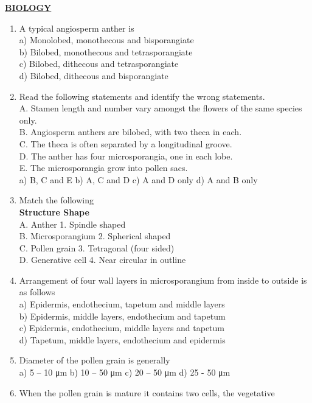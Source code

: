 \textbf{\ul{BIOLOGY}}

\begin{enumerate}
\def\labelenumi{\arabic{enumi}.}
\setcounter{enumi}{90}
\item
  A typical angiosperm anther is\\
  a) Monolobed, monothecous and bisporangiate\\
  b) Bilobed, monothecous and tetrasporangiate\\
  c) Bilobed, dithecous and tetrasporangiate\\
  d) Bilobed, dithecous and bisporangiate
\item
  Read the following statements and identify the wrong statements.\\
  A. Stamen length and number vary amongst the flowers of the same
  species only.\\
  B. Angiosperm anthers are bilobed, with two theca in each.\\
  C. The theca is often separated by a longitudinal groove.\\
  D. The anther has four microsporangia, one in each lobe.\\
  E. The microsporangia grow into pollen sacs.\\
  a) B, C and E b) A, C and D c) A and D only d) A and B only
\item
  Match the following\\
  \textbf{Structure Shape}\\
  A. Anther 1. Spindle shaped\\
  B. Microsporangium 2. Spherical shaped\\
  C. Pollen grain 3. Tetragonal (four sided)\\
  D. Generative cell 4. Near circular in outline
\item
  Arrangement of four wall layers in microsporangium from inside to
  outside is as follows\\
  a) Epidermis, endothecium, tapetum and middle layers\\
  b) Epidermis, middle layers, endothecium and tapetum\\
  c) Epidermis, endothecium, middle layers and tapetum\\
  d) Tapetum, middle layers, endothecium and epidermis
\item
  Diameter of the pollen grain is generally\\
  a) 5 -- 10 μm b) 10 -- 50 μm c) 20 -- 50 μm d) 25 - 50 μm
\item
  When the pollen grain is mature it contains two cells, the vegetative

\end{enumerate}
